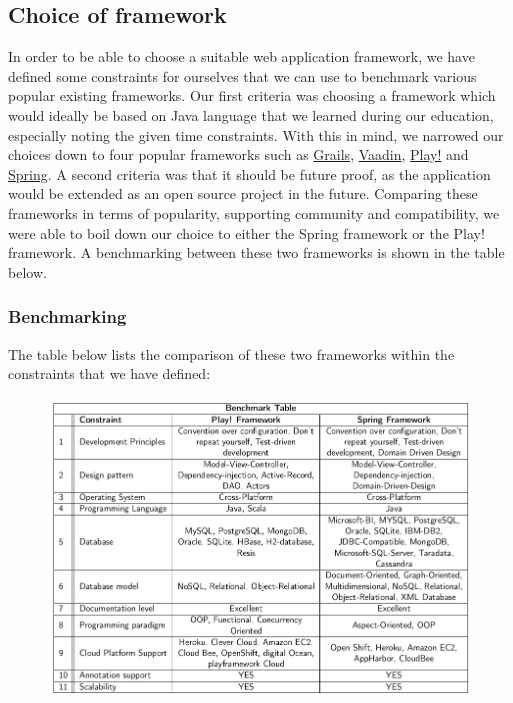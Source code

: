 \subsection{Choice of framework}
In order to be able to choose a suitable web application framework, we have defined some constraints for ourselves that we can use to benchmark various popular existing frameworks. Our first criteria was choosing a framework which would ideally be based on Java language that we learned during our education, especially noting the given time constraints. With this in mind, we narrowed our choices down to four popular frameworks such as \href{https://grails.org/}{Grails}, \href{https://vaadin.com/home}{Vaadin}, \href{https://www.playframework.com/}{Play!} and \href{http://projects.spring.io/spring-framework/}{Spring}. A second criteria was that it should be future proof, as the application would be extended as an open source project in the future. Comparing these frameworks in terms of popularity, supporting community and compatibility, we were able to boil down our choice to either the Spring framework or the Play! framework. A benchmarking between these two frameworks is shown in the table below.
\subsubsection{Benchmarking}
 The table below lists the comparison of these two frameworks within the constraints that we have defined:\\

\begin{figure}[h]
\centering
\includegraphics[scale=0.5]{./img/benchmark.png}	
\end{figure}



